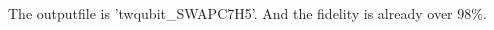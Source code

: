 \documentclass[prl,onecolumn]{revtex4-1}
\begin{document}
The outputfile is 'twqubit\_SWAPC7H5'. And the fidelity is already over 98\%.







\begin{thebibliography}{99}

\end{thebibliography}
\end{document}
